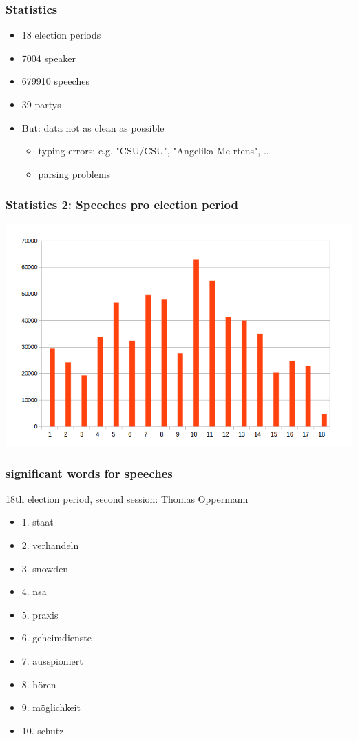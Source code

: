 \documentclass[11pt, a4paper]{beamer}
\begin{document}
\begin{frame}
\frametitle{Statistics}
\begin{itemize}
\item 18 election periods
\item 7004 speaker
\item 679910 speeches
\item 39 partys
\item But: data not as clean as possible
\begin{itemize}
\item typing errors: e.g. "CSU/CSU", "Angelika Me rtens", ..
\item parsing problems
\end{itemize}
\end{itemize}
\end{frame}

\begin{frame}
\frametitle{Statistics 2: Speeches pro election period}
\includegraphics[scale=0.4]{speechperperiod.png}
\end{frame}

\begin{frame}
\frametitle{significant words for speeches}
18th election period, second session: Thomas Oppermann
\begin{itemize}
\item 1. staat
\item 2. verhandeln
\item 3. snowden
\item 4. nsa
\item 5. praxis
\item 6. geheimdienste
\item 7. ausspioniert
\item 8. hören
\item 9. möglichkeit
\item 10. schutz
\end{itemize}
\end{frame}
\end{document}
